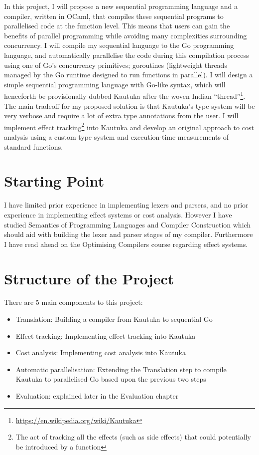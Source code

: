 \documentclass[12pt,a4paper,twoside,openright]{report}
\begin{document}
In this project, I will propose a new sequential programming language and a compiler, written in OCaml, that compiles these sequential programs to parallelised code at the function level. This means that users can gain the benefits of parallel programming while avoiding many complexities surrounding concurrency. I will compile my sequential language to the Go programming language, and automatically parallelise the code during this compilation process using one of Go's concurrency primitives; goroutines (lightweight threads managed by the Go runtime designed to run functions in parallel). I will design a simple sequential programming language with Go-like syntax, which will henceforth be provisionally dubbed Kautuka after the woven Indian ``thread''\footnote{\url{https://en.wikipedia.org/wiki/Kautuka}}. The main tradeoff for my proposed solution is that Kautuka's type system will be very verbose and require a lot of extra type annotations from the user. I will implement effect tracking\footnote{The act of tracking all the effects (such as side effects) that could potentially be introduced by a function} into Kautuka and develop an original approach to cost analysis using a custom type system and execution-time measurements of standard functions.

\section*{Starting Point}

I have limited prior experience in implementing lexers and parsers, and no prior experience in implementing effect systems or cost analysis. However I have studied Semantics of Programming Languages and Compiler Construction which should aid with building the lexer and parser stages of my compiler. Furthermore I have read ahead on the Optimising Compilers course regarding effect systems.

\section*{Structure of the Project}

There are 5 main components to this project:
\begin{itemize}
  \item Translation: Building a compiler from Kautuka to sequential Go
  \item Effect tracking: Implementing effect tracking into Kautuka 
  \item Cost analysis: Implementing cost analysis into Kautuka 
  \item Automatic parallelisation: Extending the Translation step to compile Kautuka to parallelised Go based upon the previous two steps
  \item Evaluation: explained later in the Evaluation chapter
\end{itemize}
\end{document}
